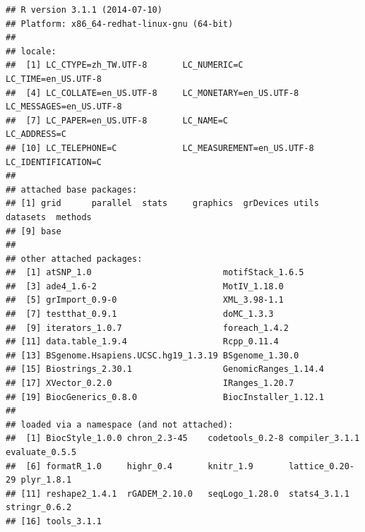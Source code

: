 \documentclass[a4paper,10pt]{article}\usepackage[]{graphicx}\usepackage[]{color}
\makeatletter
\newenvironment{kframe}{%
 \def\at@end@of@kframe{}%
 \ifinner\ifhmode%
  \def\at@end@of@kframe{\end{minipage}}%
  \begin{minipage}{\columnwidth}%
 \fi\fi%
 \def\FrameCommand##1{\hskip\@totalleftmargin \hskip-\fboxsep
 \colorbox{shadecolor}{##1}\hskip-\fboxsep
     \hskip-\linewidth \hskip-\@totalleftmargin \hskip\columnwidth}%
 \MakeFramed {\advance\hsize-\width
   \@totalleftmargin\z@ \linewidth\hsize
   \@setminipage}}%
 {\par\unskip\endMakeFramed%
 \at@end@of@kframe}
\newenvironment{knitrout}{}{} %
\makeatother
\begin{document}
\begin{knitrout}
\color{fgcolor}\begin{kframe}
\begin{verbatim}
## R version 3.1.1 (2014-07-10)
## Platform: x86_64-redhat-linux-gnu (64-bit)
## 
## locale:
##  [1] LC_CTYPE=zh_TW.UTF-8       LC_NUMERIC=C               LC_TIME=en_US.UTF-8       
##  [4] LC_COLLATE=en_US.UTF-8     LC_MONETARY=en_US.UTF-8    LC_MESSAGES=en_US.UTF-8   
##  [7] LC_PAPER=en_US.UTF-8       LC_NAME=C                  LC_ADDRESS=C              
## [10] LC_TELEPHONE=C             LC_MEASUREMENT=en_US.UTF-8 LC_IDENTIFICATION=C       
## 
## attached base packages:
## [1] grid      parallel  stats     graphics  grDevices utils     datasets  methods  
## [9] base     
## 
## other attached packages:
##  [1] atSNP_1.0                          motifStack_1.6.5                  
##  [3] ade4_1.6-2                         MotIV_1.18.0                      
##  [5] grImport_0.9-0                     XML_3.98-1.1                      
##  [7] testthat_0.9.1                     doMC_1.3.3                        
##  [9] iterators_1.0.7                    foreach_1.4.2                     
## [11] data.table_1.9.4                   Rcpp_0.11.4                       
## [13] BSgenome.Hsapiens.UCSC.hg19_1.3.19 BSgenome_1.30.0                   
## [15] Biostrings_2.30.1                  GenomicRanges_1.14.4              
## [17] XVector_0.2.0                      IRanges_1.20.7                    
## [19] BiocGenerics_0.8.0                 BiocInstaller_1.12.1              
## 
## loaded via a namespace (and not attached):
##  [1] BiocStyle_1.0.0 chron_2.3-45    codetools_0.2-8 compiler_3.1.1  evaluate_0.5.5 
##  [6] formatR_1.0     highr_0.4       knitr_1.9       lattice_0.20-29 plyr_1.8.1     
## [11] reshape2_1.4.1  rGADEM_2.10.0   seqLogo_1.28.0  stats4_3.1.1    stringr_0.6.2  
## [16] tools_3.1.1
\end{verbatim}
\end{kframe}
\end{knitrout}


%
%



\end{document}
